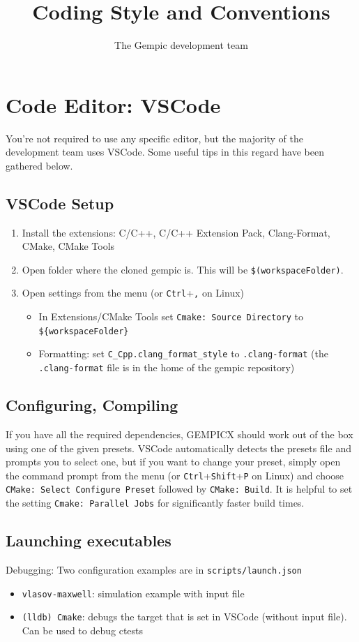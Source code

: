 \documentclass[11pt]{article}
\title{Coding Style and Conventions}
\author[1]{The Gempic development team}
\affil[1]{Max-Planck-Institut f\"ur Plasmaphysik, Garching, Germany}
\begin{document}
\maketitle

\tableofcontents

\section{Code Editor: VSCode}
You're not required to use any specific editor, but the majority of the development team uses VSCode. Some useful tips in this regard have been gathered below.

\subsection{VSCode Setup}
\begin{enumerate}
   \item Install the extensions: C/C++, C/C++ Extension Pack, Clang-Format, CMake, CMake Tools
   \item Open folder where the cloned gempic is. This will be \verb|$(workspaceFolder)|.
   \item Open settings from the menu (or \verb|Ctrl|+\verb|,| on Linux)
   \begin{itemize}
      \item In Extensions/CMake Tools set \verb|Cmake: Source Directory| to \verb|${workspaceFolder}|
      \item Formatting: set \verb|C_Cpp.clang_format_style| to \verb|.clang-format| (the \verb|.clang-format| file is in the home of the gempic repository)
   \end{itemize}
\end{enumerate}

\subsection{Configuring, Compiling}
If you have all the required dependencies, GEMPICX should work out of the box using one of the given presets. VSCode automatically detects the presets file and prompts you to select one, but if you want to change your preset, simply open the command prompt from the menu (or \verb|Ctrl|+\verb|Shift|+\verb|P| on Linux) and choose \verb|CMake: Select Configure Preset| followed by \verb|CMake: Build|. It is helpful to set the setting \verb|Cmake: Parallel Jobs| for significantly faster build times.

\subsection{Launching executables}
Debugging: Two configuration examples are in \verb|scripts/launch.json|
\begin{itemize}
   \item \verb|vlasov-maxwell|: simulation example with input file
   \item \verb|(lldb) Cmake|: debugs the target that is set in VSCode (without input file). Can be used to debug ctests
\end{itemize}
\end{document}
